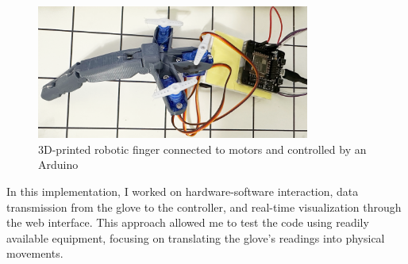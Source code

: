 \begin{figure}[h]
  \centering
  \includegraphics[width=0.80\textwidth]{images/physical-device.png}
  \caption{3D-printed robotic finger connected to motors and controlled by an Arduino}
  \label{fig:marwan:3d}
\end{figure}

In this implementation, I worked on hardware-software interaction, data transmission from the glove to the controller, and real-time visualization through the web interface. This approach allowed me to test the code using readily available equipment, focusing on translating the glove's readings into physical movements.